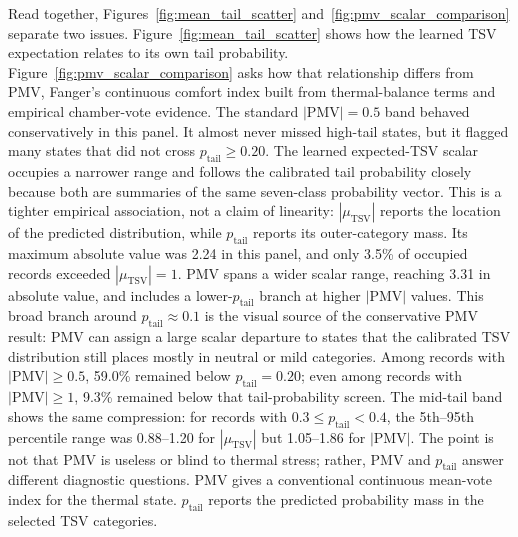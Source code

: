 Read together, Figures~\ref{fig:mean_tail_scatter} and~\ref{fig:pmv_scalar_comparison} separate two issues. Figure~\ref{fig:mean_tail_scatter} shows how the learned TSV expectation relates to its own tail probability. Figure~\ref{fig:pmv_scalar_comparison} asks how that relationship differs from PMV, Fanger's continuous comfort index built from thermal-balance terms and empirical chamber-vote evidence. The standard $|\mathrm{PMV}|=0.5$ band behaved conservatively in this panel. It almost never missed high-tail states, but it flagged many states that did not cross $p_{\mathrm{tail}}\ge0.20$. The learned expected-TSV scalar occupies a narrower range and follows the calibrated tail probability closely because both are summaries of the same seven-class probability vector. This is a tighter empirical association, not a claim of linearity: $|\mu_{\mathrm{TSV}}|$ reports the location of the predicted distribution, while $p_{\mathrm{tail}}$ reports its outer-category mass. Its maximum absolute value was 2.24 in this panel, and only 3.5\% of occupied records exceeded $|\mu_{\mathrm{TSV}}|=1$. PMV spans a wider scalar range, reaching 3.31 in absolute value, and includes a lower-$p_{\mathrm{tail}}$ branch at higher $|\mathrm{PMV}|$ values. This broad branch around $p_{\mathrm{tail}}\approx0.1$ is the visual source of the conservative PMV result: PMV can assign a large scalar departure to states that the calibrated TSV distribution still places mostly in neutral or mild categories. Among records with $|\mathrm{PMV}|\ge0.5$, 59.0\% remained below $p_{\mathrm{tail}}=0.20$; even among records with $|\mathrm{PMV}|\ge1$, 9.3\% remained below that tail-probability screen. The mid-tail band shows the same compression: for records with $0.3\le p_{\mathrm{tail}}<0.4$, the 5th--95th percentile range was 0.88--1.20 for $|\mu_{\mathrm{TSV}}|$ but 1.05--1.86 for $|\mathrm{PMV}|$. The point is not that PMV is useless or blind to thermal stress; rather, PMV and $p_{\mathrm{tail}}$ answer different diagnostic questions. PMV gives a conventional continuous mean-vote index for the thermal state. $p_{\mathrm{tail}}$ reports the predicted probability mass in the selected TSV categories.

